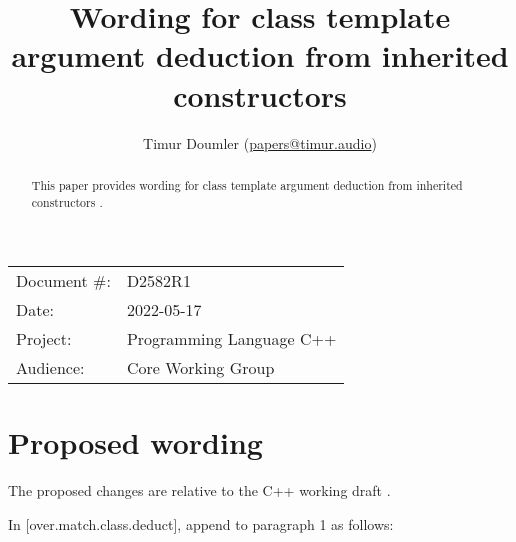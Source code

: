 

\newcommand{\forceindent}{\parindent=1em\indent\parindent=0pt\relax} %



\title{Wording for class template argument deduction from inherited constructors}
\author{
  Timur Doumler \small(\href{mailto:papers@timur.audio}{papers@timur.audio})
}
\date{}
\maketitle

\begin{tabular}{ll}
Document \#: & D2582R1 \\
Date: & 2022-05-17\\
Project: & Programming Language C++ \\
Audience: & Core Working Group
\end{tabular}


\begin{abstract}
This paper provides wording for class template argument deduction from inherited constructors \cite{P1021R6}.
\end{abstract}

\section{Proposed wording}

The proposed changes are relative to the C++ working draft \cite{N4910}. 

In [over.match.class.deduct], append to paragraph 1 as follows:

